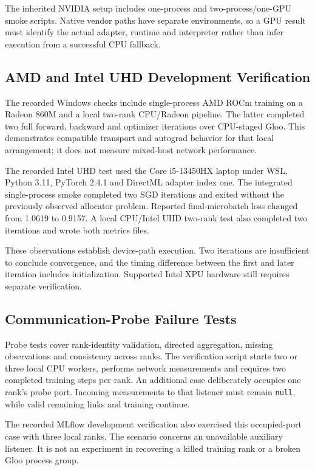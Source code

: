 The inherited NVIDIA setup includes one-process and two-process/one-GPU smoke scripts. Native vendor paths have separate environments, so a GPU result must identify the actual adapter, runtime and interpreter rather than infer execution from a successful CPU fallback.

\subsection{AMD and Intel UHD Development Verification}

The recorded Windows checks include single-process AMD ROCm training on a Radeon 860M and a local two-rank CPU/Radeon pipeline. The latter completed two full forward, backward and optimizer iterations over CPU-staged Gloo. This demonstrates compatible transport and autograd behavior for that local arrangement; it does not measure mixed-host network performance.

The recorded Intel UHD test used the Core i5-13450HX laptop under WSL, Python 3.11, PyTorch 2.4.1 and DirectML adapter index one. The integrated single-process smoke completed two SGD iterations and exited without the previously observed allocator problem. Reported final-microbatch loss changed from 1.0619 to 0.9157. A local CPU/Intel UHD two-rank test also completed two iterations and wrote both metrics files.

These observations establish device-path execution. Two iterations are insufficient to conclude convergence, and the timing difference between the first and later iteration includes initialization. Supported Intel XPU hardware still requires separate verification.

\subsection{Communication-Probe Failure Tests}

Probe tests cover rank-identity validation, directed aggregation, missing observations and consistency across ranks. The verification script starts two or three local CPU workers, performs network measurements and requires two completed training steps per rank. An additional case deliberately occupies one rank's probe port. Incoming measurements to that listener must remain \texttt{null}, while valid remaining links and training continue.

The recorded MLflow development verification also exercised this occupied-port case with three local ranks. The scenario concerns an unavailable auxiliary listener. It is not an experiment in recovering a killed training rank or a broken Gloo process group.

